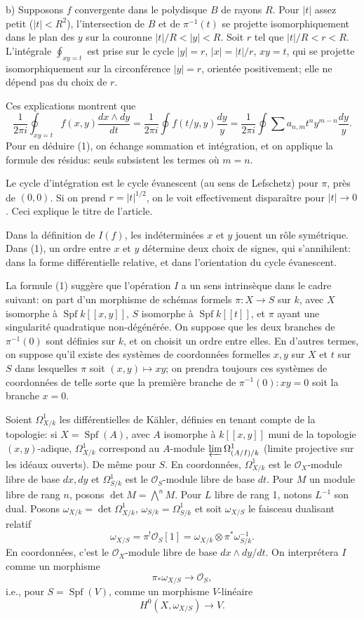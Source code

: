\documentclass[11pt,leqno]{article}
\DeclareMathOperator{\Spf}{Spf}
\newcommand{\OO}{\mathcal O}
\begin{document}
\noindent b) Supposons $f$ convergente dans le polydisque $B$ de rayons $R$. Pour $|t|$ assez petit ($|t|<R^2$), l'intersection de $B$ et de $\pi^{-1}(t)$ se projette isomorphiquement dans le plan des $y$ sur la couronne $|t|/R<|y|<R$. Soit $r$ tel que $|t|/R<r<R$. L'intégrale $\oint_{xy=t}$ est prise sur le cycle $|y|=r$, $|x|=|t|/r$, $xy=t$, qui se projette isomorphiquement sur la circonférence $|y|=r$, orientée positivement; elle ne dépend pas du choix de $r$.

Ces explications montrent que
\[
\frac{1}{2\pi i}\oint_{xy=t} f(x,y)\frac{dx\wedge dy}{dt}
=\frac{1}{2\pi i}\oint f(t/y,y)\frac{dy}{y}
=\frac{1}{2\pi i}\oint \sum a_{n,m}t^n y^{m-n}\frac{dy}{y}.
\]
Pour en déduire (1), on échange sommation et intégration, et on applique la formule des résidus: seuls subsistent les termes où $m=n$.

Le cycle d'intégration est le cycle évanescent (au sens de Lefschetz) pour $\pi$, près de $(0,0)$. Si on prend $r=|t|^{1/2}$, on le voit effectivement disparaître pour $|t|\to0$. Ceci explique le titre de l'article.

Dans la définition de $I(f)$, les indéterminées $x$ et $y$ jouent un rôle symétrique. Dans (1), un ordre entre $x$ et $y$ détermine deux choix de signes, qui s'annihilent: dans la forme différentielle relative, et dans l'orientation du cycle évanescent.

La formule (1) suggère que l'opération $I$ a un sens intrinsèque dans le cadre suivant: on part d'un morphisme de schémas formels $\pi:X\to S$ sur $k$, avec $X$ isomorphe à $\Spf k[[x,y]]$, $S$ isomorphe à $\Spf k[[t]]$, et $\pi$ ayant une singularité quadratique non-dégénérée. On suppose que les deux branches de $\pi^{-1}(0)$ sont définies sur $k$, et on choisit un ordre entre elles. En d'autres termes, on suppose qu'il existe des systèmes de coordonnées formelles $x,y$ sur $X$ et $t$ sur $S$ dans lesquelles $\pi$ soit $(x,y)\mapsto xy$; on prendra toujours ces systèmes de coordonnées de telle sorte que la première branche de $\pi^{-1}(0):xy=0$ soit la branche $x=0$.

Soient $\Omega^1_{X/k}$ les différentielles de Kähler, définies en tenant compte de la topologie: si $X=\Spf(A)$, avec $A$ isomorphe à $k[[x,y]]$ muni de la topologie $(x,y)$-adique, $\Omega^1_{X/k}$ correspond au $A$-module $\varprojlim\Omega^1_{(A/I)/k}$ (limite projective sur les idéaux ouverts). De même pour $S$. En coordonnées, $\Omega^1_{X/k}$ est le $\OO_X$-module libre de base $dx,dy$ et $\Omega^1_{S/k}$ est le $\OO_S$-module libre de base $dt$. Pour $M$ un module libre de rang $n$, posons $\det M=\bigwedge^nM$. Pour $L$ libre de rang 1, notons $L^{-1}$ son dual. Posons $\omega_{X/k}=\det\Omega^1_{X/k}$, $\omega_{S/k}=\Omega^1_{S/k}$ et soit $\omega_{X/S}$ le faisceau dualisant relatif
\[
        \omega_{X/S}=\pi^!\OO_S[1]=\omega_{X/k}\otimes\pi^*\omega_{S/k}^{-1}.
\]
\clearpage
En coordonnées, c'est le $\OO_X$-module libre de base $dx\wedge dy/dt$. On interprétera $I$ comme un morphisme
\[
        \pi_*\omega_{X/S}\longrightarrow\OO_S,
\]
i.e., pour $S=\Spf(V)$, comme un morphisme $V$-linéaire
\[
        H^0(X,\omega_{X/S})\longrightarrow V.
\]
\end{document}
